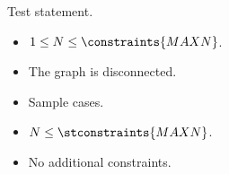 \usepackage{xcolor}
\usepackage{afterpage}
\usepackage{pifont,mdframed}
\usepackage[bottom]{footmisc}
\usepackage{caption}
\usepackage{minted}

\newcommand{\inputfile}{\texttt{stdin}}
\newcommand{\outputfile}{\texttt{stdout}}
\makeatletter
\renewcommand{\this@inputfilename}{\texttt{stdin}}
\renewcommand{\this@outputfilename}{\texttt{stdout}}
\makeatother


Test statement.


\Constraints

\begin{itemize}[nolistsep, itemsep=2mm]
    \item $1 \le N \le \constraints{MAXN}$.
    \item The graph is disconnected.
\end{itemize}


\Scoring

\begin{itemize}[nolistsep, itemsep=2mm]
    \item \subtask Sample cases.
    \item \subtask $N \le \stconstraints{MAXN}$.
    \item \subtask No additional constraints.
\end{itemize}
